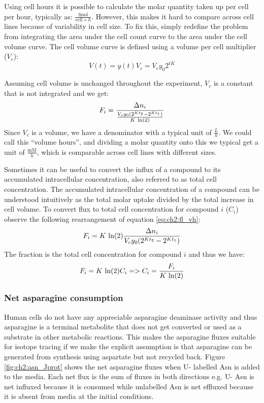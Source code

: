 Using cell hours it is possible to calculate the molar quantity taken up per cell per hour, typically as: $\frac{\text{fmol}}{\text{cell}\times h}$.
However, this makes it hard to compare across cell lines because of variability in cell size.
To fix this, simply redefine the problem from integrating the area under the cell count curve to the area under the cell volume curve.
The cell volume curve is defined using a volume per cell multiplier ($V_c$):
\begin{equation}
    V(t) = y(t) V_c = V_c y_0 2^{t K}
\end{equation}

Assuming cell volume is unchanged throughout the experiment, $V_c$ is a constant that is not integrated and we get:
\begin{equation}
    F_i = \frac{\Delta n_i}{\frac{V_c y_0 (2^{K t_2} - 2^{K t_1})}{K\ \text{ln}(2)}}
\label{eq:ch2:fl_vh}
\end{equation}
Since $V_c$ is a volume, we have a denominator with a typical unit of $\frac{L}{h}$.
We could call this ``volume hours'', and dividing a molar quantity onto this we typical get a unit of $\frac{\text{mM}}{h}$, which is comparable across cell lines with different sizes.

Sometimes it can be useful to convert the influx of a compound to its accumulated intracellular concentration, also referred to as total cell concentration.
The accumulated intracellular concentration of a compound can be understood intuitively as the total molar uptake divided by the total increase in cell volume.
To convert flux to total cell concentration for compound $i$ ($C_i$) observe the following rearrangement of equation \ref{eq:ch2:fl_vh}:
\begin{equation}
    F_i = K\ \text{ln}(2) \frac{\Delta n_i}{V_c y_0 (2^{K t_2} - 2^{K t_1})}
\end{equation}
The fraction is the total cell concentration for compound $i$ and thus we have:
\begin{equation}
    F_i = K\ \text{ln}(2) C_i => C_i = \frac{F_i}{K\ \text{ln}(2)}
\end{equation}


\subsubsection{Net asparagine consumption}
Human cells do not have any appreciable asparagine deaminase activity \cite{Sullivan2018-gz} and thus asparagine is a terminal metabolite that does not get converted or used as a substrate in other metabolic reactions.
This makes the asparagine fluxes suitable for isotope tracing if we make the explicit assumption is that asparagine can be generated from synthesis using aspartate but not recycled back.
Figure \ref{fig:ch2:asn_Jprot} shows the net asparagine fluxes when U-\hCi{} labelled Asn is added to the media.
Each net flux is the sum of fluxes in both directions e.g. U-\hCi{} Asn is net influxed because it is consumed while unlabelled Asn is net effluxed because it is absent from media at the initial conditions.

